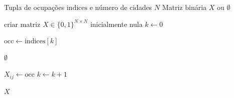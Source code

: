     \begin{algorithm}[htbp]
        \caption{Conversão dos índices de ocupação em matriz binária de arestas}
        \label{alg:indices_para_matriz}
        \begin{algorithmic}[1]
        \Require Tupla de ocupações $\mathrm{indices}$ e número de cidades $N$
        \Ensure Matriz binária $X$ ou $\emptyset$

        \State criar matriz $X \in \{0,1\}^{N \times N}$ inicialmente nula
        \State $k \gets 0$

                    \State $\mathrm{occ} \gets \mathrm{indices}[k]$

                            \State \Return $\emptyset$
                        \EndIf

                        \State $X_{ij} \gets \mathrm{occ}$
                        \State $k \gets k+1$
                    \EndIf
                \EndFor
            \EndFor

        \State \Return $X$
        \end{algorithmic}
    \end{algorithm}


